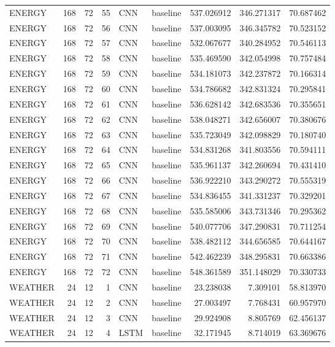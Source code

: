 \begin{table}
\begin{tabular}{lrrrllrrr}
ENERGY & 168 & 72 & 55 & CNN & baseline & 537.026912 & 346.271317 & 70.687462 \\
ENERGY & 168 & 72 & 56 & CNN & baseline & 537.003095 & 346.345782 & 70.523152 \\
ENERGY & 168 & 72 & 57 & CNN & baseline & 532.067677 & 340.284952 & 70.546113 \\
ENERGY & 168 & 72 & 58 & CNN & baseline & 535.469590 & 342.054998 & 70.757484 \\
ENERGY & 168 & 72 & 59 & CNN & baseline & 534.181073 & 342.237872 & 70.166314 \\
ENERGY & 168 & 72 & 60 & CNN & baseline & 534.786682 & 342.831324 & 70.295841 \\
ENERGY & 168 & 72 & 61 & CNN & baseline & 536.628142 & 342.683536 & 70.355651 \\
ENERGY & 168 & 72 & 62 & CNN & baseline & 538.048271 & 342.656007 & 70.380676 \\
ENERGY & 168 & 72 & 63 & CNN & baseline & 535.723049 & 342.098829 & 70.180740 \\
ENERGY & 168 & 72 & 64 & CNN & baseline & 534.831268 & 341.803556 & 70.594111 \\
ENERGY & 168 & 72 & 65 & CNN & baseline & 535.961137 & 342.260694 & 70.431410 \\
ENERGY & 168 & 72 & 66 & CNN & baseline & 536.922210 & 343.290272 & 70.555319 \\
ENERGY & 168 & 72 & 67 & CNN & baseline & 534.836455 & 341.331237 & 70.329201 \\
ENERGY & 168 & 72 & 68 & CNN & baseline & 535.585006 & 343.731346 & 70.295362 \\
ENERGY & 168 & 72 & 69 & CNN & baseline & 540.077706 & 347.290831 & 70.711254 \\
ENERGY & 168 & 72 & 70 & CNN & baseline & 538.482112 & 344.656585 & 70.644167 \\
ENERGY & 168 & 72 & 71 & CNN & baseline & 542.462239 & 348.295831 & 70.663386 \\
ENERGY & 168 & 72 & 72 & CNN & baseline & 548.361589 & 351.148029 & 70.330733 \\
WEATHER & 24 & 12 & 1 & CNN & baseline & 23.238038 & 7.309101 & 58.813970 \\
WEATHER & 24 & 12 & 2 & CNN & baseline & 27.003497 & 7.768431 & 60.957970 \\
WEATHER & 24 & 12 & 3 & CNN & baseline & 29.924908 & 8.805769 & 62.456137 \\
WEATHER & 24 & 12 & 4 & LSTM & baseline & 32.171945 & 8.714019 & 63.369676 \\

\end{tabular}
\end{table}
